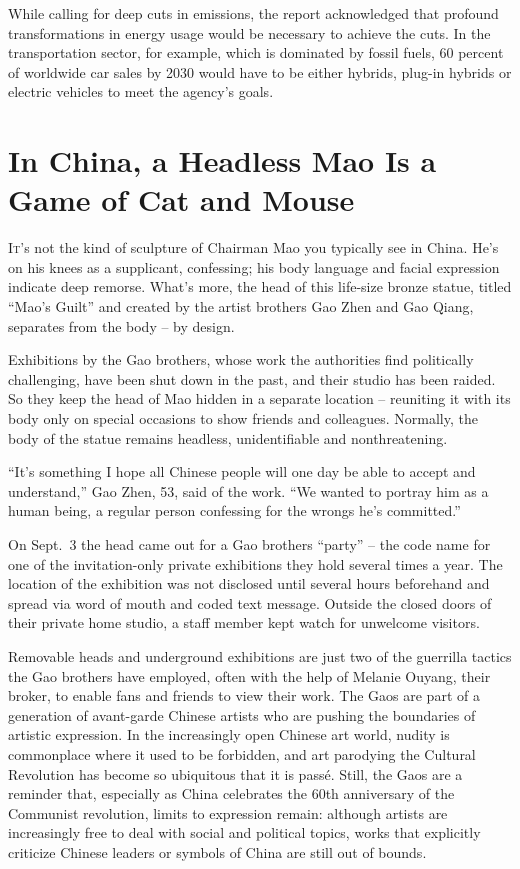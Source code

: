 ﻿\documentclass[12pt]{article}
\begin{document}
While calling for deep cuts in emissions, the report acknowledged that profound transformations in
energy usage would be necessary to achieve the cuts. In the transportation sector, for example,
which is dominated by fossil fuels, 60 percent of worldwide car sales by 2030 would have to be
either hybrids, plug-in hybrids or electric vehicles to meet the agency's goals.

\section{In China, a Headless Mao Is a Game of Cat and Mouse}

\lettrine{I}{t}'s not the kind of sculpture of Chairman Mao you typically
see in China. He's on his knees as a supplicant, confessing; his body language and facial expression
indicate deep remorse\cite{remorse}. What's more, the head of this life-size bronze statue, titled
``Mao's Guilt'' and created by the artist brothers Gao Zhen and Gao Qiang, separates from the body
-- by design.

Exhibitions by the Gao brothers, whose work the authorities find politically challenging, have been
shut down in the past, and their studio has been raided. So they keep the head of Mao hidden in a
separate location -- reuniting it with its body only on special occasions to show friends and
colleagues. Normally, the body of the statue remains headless, unidentifiable and nonthreatening.

``It's something I hope all Chinese people will one day be able to accept and understand,'' Gao
Zhen, 53, said of the work. ``We wanted to portray him as a human being, a regular person confessing
for the wrongs he's committed.''

On Sept.~3 the head came out for a Gao brothers ``party'' -- the code name for one of the
invitation-only private exhibitions they hold several times a year. The location of the exhibition
was not disclosed until several hours beforehand and spread via word of mouth and coded text
message. Outside the closed doors of their private home studio, a staff member kept watch for
unwelcome visitors.

Removable heads and underground exhibitions are just two of the guerrilla tactics the Gao brothers
have employed, often with the help of Melanie Ouyang, their broker, to enable fans and friends to
view their work. The Gaos are part of a generation of avant-garde Chinese artists who are pushing
the boundaries of artistic expression. In the increasingly open Chinese art world, nudity is
commonplace where it used to be forbidden, and art parodying the Cultural Revolution has become so
ubiquitous that it is pass\'e. Still, the Gaos are a reminder that, especially as China celebrates
the 60th anniversary of the Communist revolution, limits to expression remain: although artists are
increasingly free to deal with social and political topics, works that explicitly criticize Chinese
leaders or symbols of China are still out of bounds.
\end{document}
